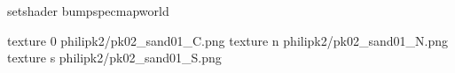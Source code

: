 setshader bumpspecmapworld

texture 0 philipk2/pk02_sand01_C.png
texture n philipk2/pk02_sand01_N.png
texture s philipk2/pk02_sand01_S.png

